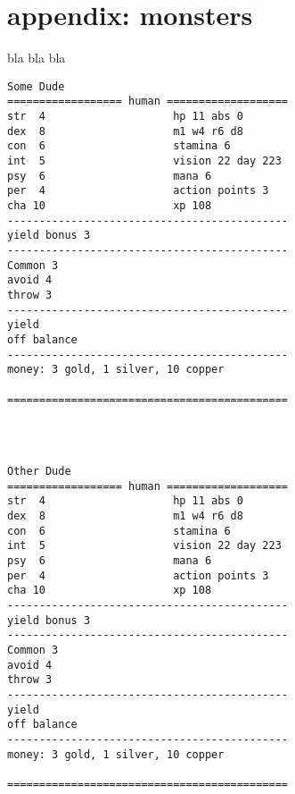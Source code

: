 \newpage
\section*{appendix: monsters}

bla bla bla


\pagebreak[2]
\small
\begin{verbatim}
Some Dude
================== human ===================
str  4                    hp 11 abs 0
dex  8                    m1 w4 r6 d8
con  6                    stamina 6
int  5                    vision 22 day 223
psy  6                    mana 6
per  4                    action points 3
cha 10                    xp 108
--------------------------------------------
yield bonus 3
--------------------------------------------
Common 3
avoid 4
throw 3
--------------------------------------------
yield
off balance
--------------------------------------------
money: 3 gold, 1 silver, 10 copper

============================================




\end{verbatim} \pagebreak[2] \begin{verbatim}
Other Dude
================== human ===================
str  4                    hp 11 abs 0
dex  8                    m1 w4 r6 d8
con  6                    stamina 6
int  5                    vision 22 day 223
psy  6                    mana 6
per  4                    action points 3
cha 10                    xp 108
--------------------------------------------
yield bonus 3
--------------------------------------------
Common 3
avoid 4
throw 3
--------------------------------------------
yield
off balance
--------------------------------------------
money: 3 gold, 1 silver, 10 copper

============================================




\end{verbatim}
\normalsize





